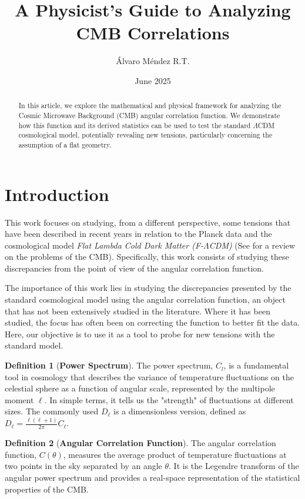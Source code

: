 \documentclass{article}
\title{A Physicist's Guide to Analyzing CMB Correlations}
\author{Álvaro Méndez R.T.}
\date{June 2025}
\theoremstyle{definition}
\newtheorem{definition}{Definition}[section]
\begin{document}
\maketitle
\tableofcontents

\begin{abstract}
In this article, we explore the mathematical and physical framework for analyzing the Cosmic Microwave Background (CMB) angular correlation function. We demonstrate how this function and its derived statistics can be used to test the standard $\Lambda$CDM cosmological model, potentially revealing new tensions, particularly concerning the assumption of a flat geometry.
\end{abstract}

\section{Introduction}
This work focuses on studying, from a different perspective, some tensions that have been described in recent years in relation to the Planck data and the cosmological model \textit{Flat Lambda Cold Dark Matter (F-$\Lambda$CDM)} (See \autocite{ABDALLA202249} for a review on the problems of the CMB). Specifically, this work consists of studying these discrepancies from the point of view of the angular correlation function.

The importance of this work lies in studying the discrepancies presented by the standard cosmological model using the angular correlation function, an object that has not been extensively studied in the literature. Where it has been studied, the focus has often been on correcting the function to better fit the data. Here, our objective is to use it as a tool to probe for new tensions with the standard model.

\begin{definition}[\textbf{Power Spectrum}]
  The power spectrum, $C_l$, is a fundamental tool in cosmology that describes the variance of temperature fluctuations on the celestial sphere as a function of angular scale, represented by the multipole moment $\ell$. In simple terms, it tells us the "strength" of fluctuations at different sizes. The commonly used $D_\ell$ is a dimensionless version, defined as $D_\ell = \frac{\ell(\ell+1)}{2\pi}C_\ell$.
\end{definition}

\begin{definition}[\textbf{Angular Correlation Function}]
  The angular correlation function, $C(\theta)$, measures the average product of temperature fluctuations at two points in the sky separated by an angle $\theta$. It is the Legendre transform of the angular power spectrum and provides a real-space representation of the statistical properties of the CMB.
\end{definition}
\end{document}

